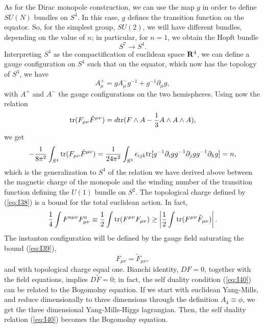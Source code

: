 As for the Dirac monopole construction, we can use the map $g$ in order 
to define $SU(N)$ bundles on $S^4$. In this case, $g$ defines the transition function on 
the equator. So, for the simplest group, $SU(2)$, we will 
have different bundles, depending on 
the value of $n$; in particular, for $n=1$, we obtain the 
Hopft bundle
\begin{equation}
S^7 \longrightarrow S^4.
\label{eq:I35}
\end{equation}
Interpreting $S^4$ as the compactification of euclidean space 
${\bf R}^4$, we can define a gauge configuration on $S^4$ such 
that on the equator, which now has the topology of 
$S^3$, we have
\begin{equation}
A_{\mu}^+ = g A_{\mu}^- g^{-1} + g^{-1} \partial_{\mu} g,
\label{eq:I36}
\end{equation}
with $A^+$ and $A^-$ the gauge configurations on the two hemispheres. Using 
now the relation
\begin{equation}
\hbox {tr} (F_{\mu \nu} \tilde{F}^{\mu \nu}) = 
d \hbox {tr} ( F \wedge A - \frac {1}{3} A \wedge A \wedge A),
\label{eq:I37}  
\end{equation}
we get
\begin{equation}
- \frac {1}{8 \pi^2} \int_{S^4} \hbox {tr} (F_{\mu \nu}
\tilde{F}^{\mu \nu}) = \frac {1}{24 \pi^2} \int_{S^3}
\epsilon_{ijk} \hbox {tr} [g^{-1} \partial_i g g^{-1} \partial_j
g g^{-1} \partial_k g] = n,
\label{eq:I38}
\end{equation}
which is the generalization to $S^4$ of the relation we have
derived above between the magnetic charge of the monopole and the
winding number of the transition function defining the $U(1)$
bundle on $S^2$. The topological charge defined by
(\ref{eq:I38}) is a bound for the total euclidean action. In
fact,
\begin{equation}
\frac {1}{4} \int F^{a \mu \nu} F^{a}_{\mu \nu} \equiv \frac
{1}{2} \int \hbox {tr} (F^{\mu \nu} F_{\mu \nu}) \geq \left|
\frac {1}{2} \int \hbox {tr} (F^{\mu \nu} \tilde{F}_{\mu \nu}) \right|.
\label{eq:I39}
\end{equation}
The instanton configuration will be defined by the gauge field
saturating the bound (\ref{eq:I39}),
\begin{equation}
F_{\mu \nu} = \tilde{F}_{\mu \nu},
\label{eq:I40}
\end{equation}
and with topological charge equal one. Bianchi identity, $DF=0$,
together with  the field equations, implies $D \tilde{F}=0$; in fact, the self duality condition (\ref{eq:I40}) 
can be related to the Bogomolny equation. If we start with euclidean Yang-Mills, and reduce 
dimensionally to three dimensions through the definition $A_4 \equiv \phi$, we 
get the three dimensional Yang-Mills-Higgs lagrangian. Then, the self duality relation 
(\ref{eq:I40}) becomes the Bogomolny equation. 
  
